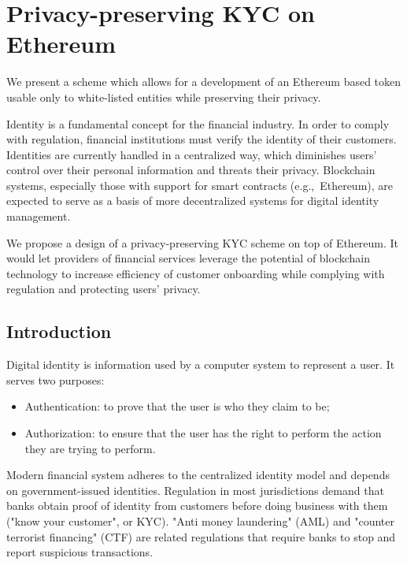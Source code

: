 \chapter{Privacy-preserving KYC on Ethereum}

\label{Chapter12_KYC}

We present a scheme which allows for a development of an Ethereum based token usable only to white-listed entities while preserving their privacy.

Identity is a fundamental concept for the financial industry.
In order to comply with regulation, financial institutions must verify the identity of their customers.
Identities are currently handled in a centralized way, which diminishes users' control over their personal information and threats their privacy.
Blockchain systems, especially those with support for smart contracts (e.g.,~Ethereum), are expected to serve as a basis of more decentralized systems for digital identity management.

We propose a design of a privacy-preserving KYC scheme on top of Ethereum.
It would let providers of financial services leverage the potential of blockchain technology to increase efficiency of customer onboarding while complying with regulation and protecting users' privacy.



\section{Introduction}

Digital identity is information used by a computer system to represent a user.
It serves two purposes:

\begin{itemize}
	\item Authentication: to prove that the user is who they claim to be;
	\item Authorization: to ensure that the user has the right to perform the action they are trying to perform.
\end{itemize}

Modern financial system adheres to the centralized identity model and depends on government-issued identities.
Regulation in most jurisdictions demand that banks obtain proof of identity from customers before doing business with them ("know your customer", or KYC).
"Anti money laundering" (AML) and "counter terrorist financing" (CTF) are related regulations that require banks to stop and report suspicious transactions.

